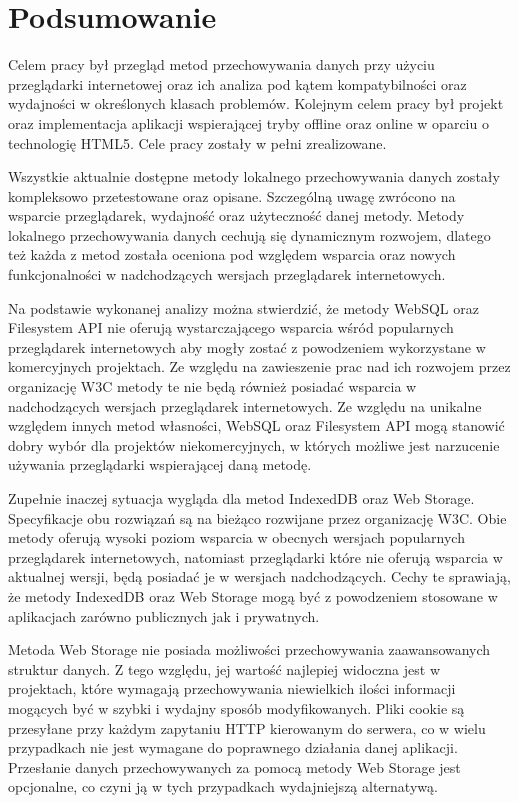 \chapter{Podsumowanie}
\label{cha:podsumowanie}

Celem pracy był przegląd metod przechowywania danych przy użyciu przeglądarki internetowej oraz ich analiza pod kątem kompatybilności oraz wydajności w określonych klasach problemów. Kolejnym celem pracy był projekt oraz implementacja aplikacji wspierającej tryby offline oraz online w oparciu o technologię HTML5. Cele pracy zostały w pełni zrealizowane.

Wszystkie aktualnie dostępne metody lokalnego przechowywania danych zostały kompleksowo przetestowane oraz opisane. Szczególną uwagę zwrócono na wsparcie przeglądarek, wydajność oraz użyteczność danej metody. Metody lokalnego przechowywania danych cechują się dynamicznym rozwojem, dlatego też każda z metod została oceniona pod względem wsparcia oraz nowych funkcjonalności w nadchodzących wersjach przeglądarek internetowych.

Na podstawie wykonanej analizy można stwierdzić, że metody WebSQL oraz Filesystem API nie oferują wystarczającego wsparcia wśród popularnych przeglądarek internetowych aby mogły zostać z powodzeniem wykorzystane w komercyjnych projektach. Ze względu na zawieszenie prac nad ich rozwojem przez organizację W3C metody te nie będą również posiadać wsparcia w nadchodzących wersjach przeglądarek internetowych. Ze względu na unikalne względem innych metod własności, WebSQL oraz Filesystem API mogą stanowić dobry wybór dla projektów niekomercyjnych, w których możliwe jest narzucenie używania przeglądarki wspierającej daną metodę.

Zupełnie inaczej sytuacja wygląda dla metod IndexedDB oraz Web Storage. Specyfikacje obu rozwiązań są na bieżąco rozwijane przez organizację W3C. Obie metody oferują wysoki poziom wsparcia w obecnych wersjach popularnych przeglądarek internetowych, natomiast przeglądarki które nie oferują wsparcia w aktualnej wersji, będą posiadać je w wersjach nadchodzących. Cechy te sprawiają, że metody IndexedDB oraz Web Storage mogą być z powodzeniem stosowane w aplikacjach zarówno publicznych jak i prywatnych.

Metoda Web Storage nie posiada możliwości przechowywania zaawansowanych struktur danych. Z tego względu, jej wartość najlepiej widoczna jest w projektach, które wymagają przechowywania niewielkich ilości informacji mogących być w szybki i wydajny sposób modyfikowanych. Pliki cookie są przesyłane przy każdym zapytaniu HTTP kierowanym do serwera, co w wielu przypadkach nie jest wymagane do poprawnego działania danej aplikacji. Przesłanie danych przechowywanych za pomocą metody Web Storage jest opcjonalne, co czyni ją w tych przypadkach wydajniejszą alternatywą.

